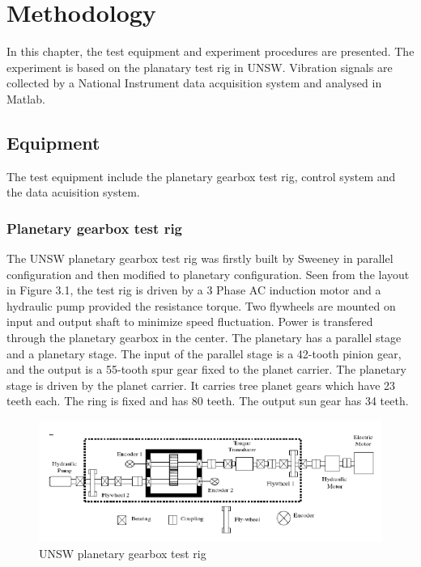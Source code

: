 \chapter{Methodology}\label{ch:methodology}

In this chapter, the test equipment and experiment procedures are presented. The experiment is based on the planatary test rig in UNSW. Vibration signals are collected by a National Instrument data acquisition system and analysed in Matlab.

\section{Equipment}

The test equipment include the planetary gearbox test rig, control system and the data acuisition system.

\subsection{Planetary gearbox test rig}

The UNSW planetary gearbox test rig was firstly built by Sweeney in parallel configuration and then modified to planetary configuration. Seen from the layout in Figure 3.1, the test rig is driven by a 3 Phase AC induction motor and a hydraulic pump provided the resistance torque. Two flywheels are mounted on input and output shaft to minimize speed fluctuation.
Power is transfered through the planetary gearbox in the center. The planetary has a parallel stage and a planetary stage. The input of the parallel stage is a 42-tooth pinion gear, and the output is a 55-tooth spur gear fixed to the planet carrier. The planetary stage is driven by the planet carrier. It carries tree planet gears which have 23 teeth each. The ring is fixed and has 80 teeth. The output sun gear has 34 teeth.

\begin{figure}
	\centering
	\includegraphics{rig}
	\caption{UNSW planetary gearbox test rig}
	\label{testrig}
\end{figure}

